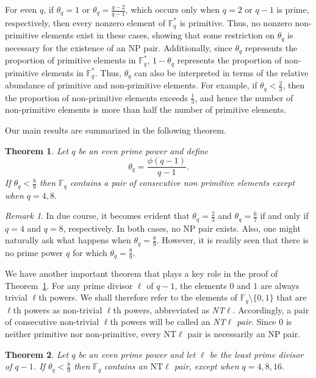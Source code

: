 \documentclass[12pt]{amsart}
\newtheorem{theorem}{Theorem}[section]
\theoremstyle{definition}
\theoremstyle{remark}
\newtheorem*{remark}{Remark}
\numberwithin{equation}{section}
\begin{document}
For even $q$, if $\theta_q=1$ or $\theta_q=\frac{q-2}{q-1}$, which occurs only when $q=2$ or $q-1$ is prime, respectively, then every nonzero element of $\mathbb{F}_q^*$ is primitive. Thus, no nonzero non-primitive elements exist in these cases, showing that some restriction on $\theta_q$ is necessary for the existence of an NP pair. Additionally, since $\theta_q$ represents the proportion of primitive elements in $\mathbb{F}_q^*$, $1-\theta_q$ represents the proportion of non-primitive elements in $\mathbb{F}_q^*$. Thus, $\theta_q$ can also be interpreted in terms of the relative abundance of primitive and non-primitive elements. For example, if $\theta_q<\frac{2}{3}$, then the proportion of non-primitive elements exceeds $\frac{1}{3}$, and hence the number of non-primitive elements is more than half the number of primitive elements.

Our main results are summarized in the following theorem.

\begin{theorem}\label{1.1}
Let $q$ be an even prime power and define
\[
\theta_q=\frac{\phi(q-1)}{q-1}.
\]
If $\theta_q<\frac{8}{9}$ then $\mathbb{F}_q$ contains a pair of consecutive non primitive elements except when $q=4, 8.$
\end{theorem}


\begin{remark}
In due course, it becomes evident that $\theta_q=\frac{2}{3}$ and $\theta_q=\frac{6}{7}$ if and only if $q=4$ and $q=8$, respectively. In both cases, no NP pair exists. Also, one might naturally ask what happens when $\theta_q=\frac{8}{9}$. However, it is readily seen that there is no prime power $q$ for which $\theta_q=\frac{8}{9}$.
\end{remark}


We have another important theorem that plays a key role in the proof of Theorem~\ref{1.1}. For any prime divisor $\ell$ of $q-1$, the elements $0$ and $1$ are always trivial $\ell$th powers. We shall therefore refer to the elements of $\mathbb{F}_q\setminus\{0,1\}$ that are $\ell$th powers as non-trivial $\ell$th powers, abbreviated as \emph{NT$\ell$}. Accordingly, a pair of consecutive non-trivial $\ell$th powers will be called an \emph{NT$\ell$ pair}. Since $0$ is neither primitive nor non-primitive, every NT$\ell$ pair is necessarily an NP pair.

\begin{theorem}\label{T1.2}
Let $q$ be an even prime power and let $\ell$ be the least prime divisor of $q-1$. If $\theta_q<\frac{8}{9}$ then $\mathbb{F}_q$ contains an $\mathrm{NT}\ell$ pair, except when $q=4,8,16$.
\end{theorem}
\end{document}
